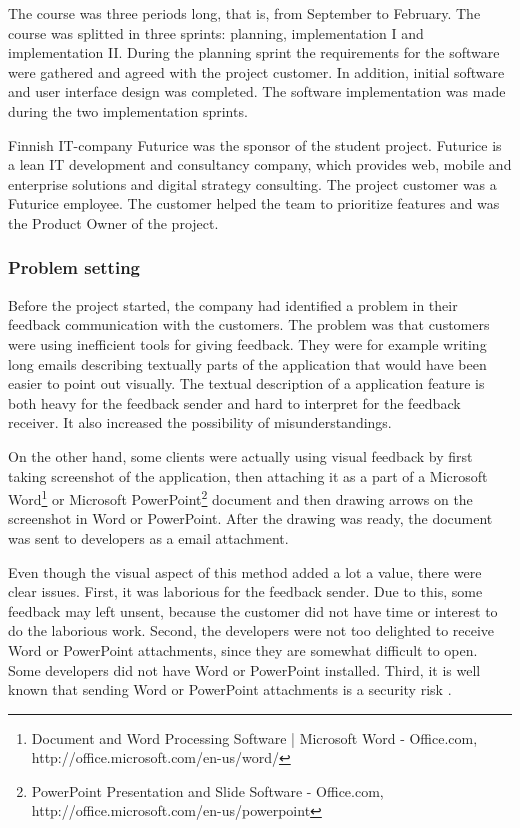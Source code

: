 \documentclass[english,12pt,a4paper,pdftex]{article}
\begin{document}
The course was three periods long, that is, from September to February. The course was splitted in three sprints: planning, implementation I and implementation II. During the planning sprint the requirements for the software were gathered and agreed with the project customer. In addition, initial software and user interface design was completed. The software implementation was made during the two implementation sprints.

Finnish IT-company Futurice was the sponsor of the student project. Futurice is a lean IT development and consultancy company, which provides web, mobile and enterprise solutions and digital strategy consulting. The project customer was a Futurice employee. The customer helped the team to prioritize features and was the Product Owner of the project. 

\subsubsection{Problem setting}

Before the project started, the company had identified a problem in their feedback communication with the customers. The problem was that customers were using inefficient tools for giving feedback. They were for example writing long emails describing textually parts of the application that would have been easier to point out visually. The textual description of a application feature is both heavy for the feedback sender and hard to interpret for the feedback receiver. It also increased the possibility of misunderstandings.

On the other hand, some clients were actually using visual feedback by first taking screenshot of the application, then attaching it as a part of a Microsoft Word\footnote{Document and Word Processing Software | Microsoft Word - Office.com, http://office.microsoft.com/en-us/word/} or Microsoft PowerPoint\footnote{PowerPoint Presentation and Slide Software - Office.com, http://office.microsoft.com/en-us/powerpoint} document and then drawing arrows on the screenshot in Word or PowerPoint. After the drawing was ready, the document was sent to developers as a email attachment. 

Even though the visual aspect of this method added a lot a value, there were clear issues. First, it was laborious for the feedback sender. Due to this, some feedback may left unsent, because the customer did not have time or interest to do the laborious work. Second, the developers were not too delighted to receive Word or PowerPoint attachments, since they are somewhat difficult to open. Some developers did not have Word or PowerPoint installed. Third, it is well known that sending Word or PowerPoint attachments is a security risk \citep{tyson2011}.
\end{document}
